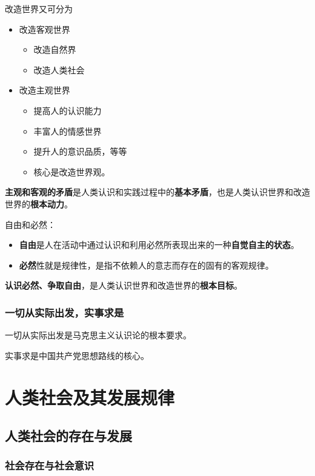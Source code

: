 \documentclass[12pt, a4paper, oneside]{ctexart}
\begin{document}
改造世界又可分为
\begin{itemize}
  \item 改造客观世界
  \begin{itemize}
    \item 改造自然界
    \item 改造人类社会
  \end{itemize}
  \item 改造主观世界
  \begin{itemize}
    \item 提高人的认识能力
    \item 丰富人的情感世界
    \item 提升人的意识品质，等等
    \item 核心是改造世界观。
  \end{itemize}
\end{itemize}

\textbf{主观和客观的矛盾}是人类认识和实践过程中的\textbf{基本矛盾}，也是人类认识世界和改造世界的\textbf{根本动力}。

自由和必然：
\begin{itemize}
  \item {\bf 自由}是人在活动中通过认识和利用必然所表现出来的一种\textbf{自觉自主的状态}。
  \item {\bf 必然}性就是规律性，是指不依赖人的意志而存在的固有的客观规律。
\end{itemize}

\textbf{认识必然、争取自由}，是人类认识世界和改造世界的\textbf{根本目标}。

\subsubsection{一切从实际出发，实事求是}

一切从实际出发是马克思主义认识论的根本要求。

实事求是中国共产党思想路线的核心。

\section{人类社会及其发展规律}

\subsection{人类社会的存在与发展}

\subsubsection{社会存在与社会意识}
\end{document}
